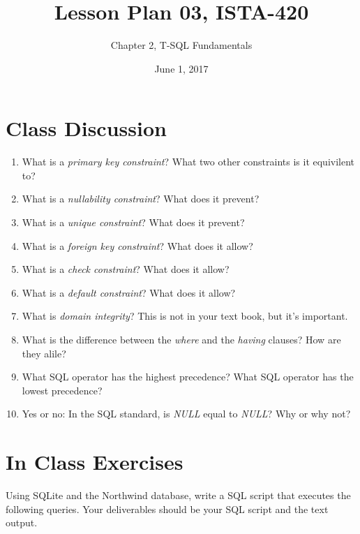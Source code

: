 \documentclass{article}
\title{Lesson Plan 03, ISTA-420}
\author{Chapter 2, T-SQL Fundamentals}
\date{June 1, 2017}
\begin{document}
    

    \maketitle{}

    \section{Class Discussion}

    \begin{enumerate}

        \item What is a \textit{primary key constraint}? What two other constraints is it equivilent to?
        \item What is a \textit{nullability constraint}? What does it prevent?
        \item What is a \textit{unique constraint}? What does it prevent?
        \item What is a \textit{foreign key constraint}? What does it allow?
        \item What is a \textit{check constraint}? What does it allow?
        \item What is a \textit{default constraint}? What does it allow?
        \item What is \textit{domain integrity}? This is not in your text book, but it's important.
        \item What is the difference between the \textit{where} and the \textit{having} clauses? How are they alile?
        \item What SQL operator has the highest precedence? What SQL operator has the lowest precedence?
        \item Yes or no: In the SQL standard, is \textit{NULL} equal to  \textit{NULL}? Why or why not?



    \end{enumerate}


    \section{In Class Exercises}

Using SQLite and the Northwind database, write a SQL script that executes the following queries. Your deliverables should be your SQL script and the text output.
\end{document}
